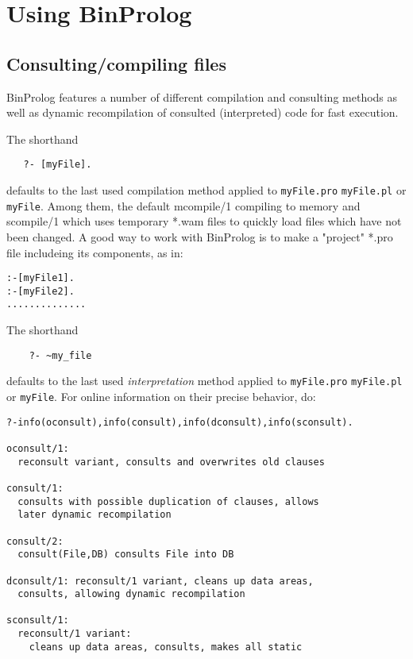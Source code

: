 \documentclass{article}
\begin{document}
\section{Using BinProlog}

\subsection{Consulting/compiling files}

BinProlog features a number of different compilation and consulting
methods as well as dynamic recompilation of consulted (interpreted) code
for fast execution.

\noindent The shorthand

\begin{verbatim}
   ?- [myFile].
\end{verbatim}

\noindent defaults to the last used compilation method applied to
{\tt myFile.pro} {\tt myFile.pl} or {\tt myFile}. Among them,
the default mcompile/1 compiling to memory and scompile/1 which
uses temporary *.wam files to quickly load files which have not been
changed. A good way to work with BinProlog is to make a "project" *.pro
file includeing its components, as in:

\begin{verbatim}
:-[myFile1].
:-[myFile2].
..............
\end{verbatim}

\noindent  The shorthand

\begin{verbatim}
    ?- ~my_file
\end{verbatim}

\noindent defaults to the last used {\em interpretation} method applied to
{\tt myFile.pro} {\tt myFile.pl} or {\tt myFile}.
For online information
on their precise behavior, do:

\begin{verbatim}
?-info(oconsult),info(consult),info(dconsult),info(sconsult).

oconsult/1: 
  reconsult variant, consults and overwrites old clauses

consult/1: 
  consults with possible duplication of clauses, allows 
  later dynamic recompilation

consult/2: 
  consult(File,DB) consults File into DB

dconsult/1: reconsult/1 variant, cleans up data areas, 
  consults, allowing dynamic recompilation

sconsult/1: 
  reconsult/1 variant: 
    cleans up data areas, consults, makes all static
\end{verbatim}
\end{document}
